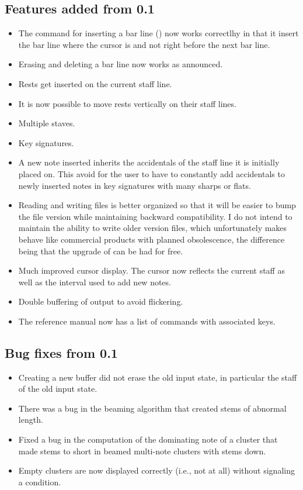 \subsection{Features added from 0.1}

\begin{itemize}
\item The command for inserting a bar line (\kbd{|}) now works
  correctlhy in that it insert the bar line where the cursor is and
  not right before the next bar line.
\item Erasing and deleting a bar line now works as announced.
\item Rests get inserted on the current staff line. 
\item It is now possible to move rests vertically on their staff
  lines. 
\item Multiple staves.
\item Key signatures.
\item A new note inserted inherits the accidentals of the staff line
  it is initially placed on.  This avoid for the user to have to
  constantly add accidentals to newly inserted notes in key signatures
  with many sharps or flats.
\item Reading and writing {\gs} files is better organized so that it
  will be easier to bump the file version while maintaining backward
  compatibility.  I do not intend to maintain the ability to write
  older version files, which unfortunately makes {\gs} behave like
  commercial products with planned obsolescence, the difference being
  that the upgrade of {\gs} can be had for free.
\item Much improved cursor display.  The cursor now reflects the
  current staff as well as the interval used to add new notes.
\item Double buffering of output to avoid flickering.
\item The reference manual now has a list of commands with associated
  keys. 
\end{itemize}

\subsection{Bug fixes from 0.1}
\begin{itemize}
\item Creating a new buffer did not erase the old input state, in
  particular the staff of the old input state. 
\item There was a bug in the beaming algorithm that created stems of
  abnormal length. 
\item Fixed a bug in the computation of the dominating note of a
  cluster that made stems to short in beamed multi-note clusters with
  stems down.
\item Empty clusters are now displayed correctly (i.e., not at all)
  without signaling a condition. 
\end{itemize}

